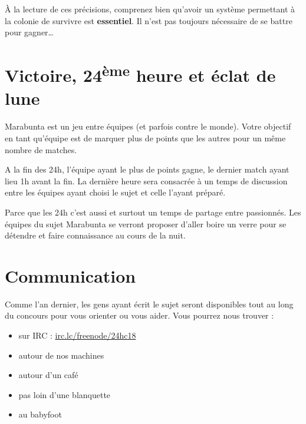 \documentclass[a4paper, 11pt]{article}
\begin{document}
À la lecture de ces précisions, comprenez bien qu'avoir un système permettant à la colonie
de survivre est \textbf{essentiel}. Il n'est pas toujours nécessaire de se battre pour
gagner\ldots

	\section{Victoire, 24\textsuperscript{ème} heure et éclat de lune}

Marabunta est un jeu entre équipes (et parfois contre le monde). Votre objectif en tant
qu'équipe est de marquer plus de points que les autres pour un même nombre de matches.

A la fin des 24h, l'équipe ayant le plus de points gagne, le \textcolor{Sred}{dernier
match ayant lieu 1h avant la fin}. La dernière heure sera consacrée à un temps de
discussion entre les équipes ayant choisi le sujet et celle l'ayant préparé.

\bigskip

\textcolor{Sblue}{Parce que les 24h c'est aussi et surtout un temps de partage entre
passionnés. Les équipes du sujet Marabunta se verront proposer d'aller boire un verre pour
se détendre et faire connaissance au cours de la nuit.}

	\section{Communication}

	Comme l'an dernier, les gens ayant écrit le sujet seront disponibles tout au long du concours pour vous orienter ou
	vous aider. Vous pourrez nous trouver :

	\begin{itemize}
		\item sur IRC : \url{irc.lc/freenode/24hc18}
		\item autour de nos machines
		\item autour d'un café
		\item pas loin d'une blanquette
		\item au babyfoot
	\end{itemize}
\end{document}
